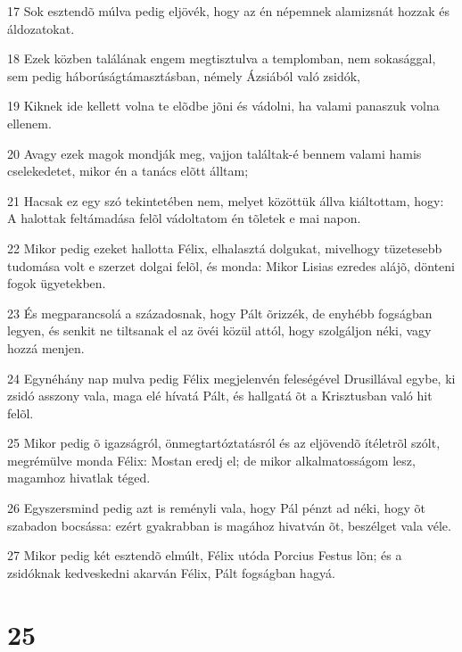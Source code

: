 \par 17 Sok esztendõ múlva pedig eljövék, hogy az én népemnek alamizsnát hozzak és áldozatokat.
\par 18 Ezek közben találának engem megtisztulva a templomban, nem sokasággal, sem pedig háborúságtámasztásban, némely Ázsiából való zsidók,
\par 19 Kiknek ide kellett volna te elõdbe jõni és vádolni, ha valami panaszuk volna ellenem.
\par 20 Avagy ezek magok mondják meg, vajjon találtak-é bennem valami hamis cselekedetet, mikor én a tanács elõtt álltam;
\par 21 Hacsak ez egy szó tekintetében nem, melyet közöttük állva kiáltottam, hogy: A halottak feltámadása felõl vádoltatom én tõletek e mai napon.
\par 22 Mikor pedig ezeket hallotta Félix, elhalasztá dolgukat, mivelhogy tüzetesebb tudomása volt e szerzet dolgai felõl, és monda: Mikor Lisias ezredes alájõ, dönteni fogok ügyetekben.
\par 23 És megparancsolá a századosnak, hogy Pált õrizzék, de enyhébb fogságban legyen, és senkit ne tiltsanak el az övéi közül attól, hogy szolgáljon néki, vagy hozzá menjen.
\par 24 Egynéhány nap mulva pedig Félix megjelenvén feleségével Drusillával egybe, ki zsidó asszony vala, maga elé hívatá Pált, és hallgatá õt a Krisztusban való hit felõl.
\par 25 Mikor pedig õ igazságról, önmegtartóztatásról és az eljövendõ ítéletrõl szólt, megrémülve monda Félix: Mostan eredj el; de mikor alkalmatosságom lesz, magamhoz hivatlak téged.
\par 26 Egyszersmind pedig azt is reményli vala, hogy Pál pénzt ad néki, hogy õt szabadon bocsássa: ezért gyakrabban is magához hivatván õt, beszélget vala véle.
\par 27 Mikor pedig két esztendõ elmúlt, Félix utóda Porcius Festus lõn; és a zsidóknak kedveskedni akarván Félix, Pált fogságban hagyá.

\chapter{25}

